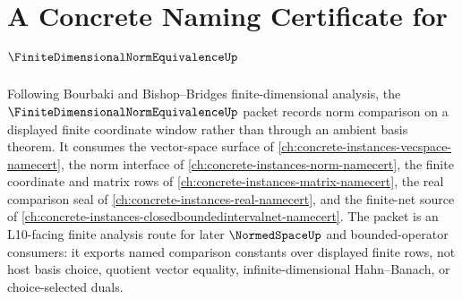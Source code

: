 \chapter{A Concrete Naming Certificate for $\FiniteDimensionalNormEquivalenceUp$}
\label{ch:concrete-instances-finite-dimensional-norm-equivalence-namecert}

Following Bourbaki and Bishop--Bridges finite-dimensional analysis, the $\FiniteDimensionalNormEquivalenceUp$ packet records norm comparison on a displayed finite coordinate window rather than through an ambient basis theorem. It consumes the vector-space surface of \autoref{ch:concrete-instances-vecspace-namecert}, the norm interface of \autoref{ch:concrete-instances-norm-namecert}, the finite coordinate and matrix rows of \autoref{ch:concrete-instances-matrix-namecert}, the real comparison seal of \autoref{ch:concrete-instances-real-namecert}, and the finite-net source of \autoref{ch:concrete-instances-closedboundedintervalnet-namecert}. The packet is an L10-facing finite analysis route for later $\NormedSpaceUp$ and bounded-operator consumers: it exports named comparison constants over displayed finite rows, not host basis choice, quotient vector equality, infinite-dimensional Hahn--Banach, or choice-selected duals.

